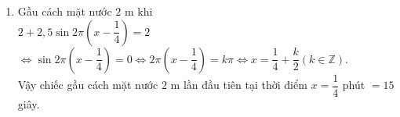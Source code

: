\begin{ex}
{\begin{enumerate}
			Tương tự, gầu  ở vị trí thấp $y=0{,}5$
			\begin{eqnarray*}
				& &\sin 2\pi \left( x-\dfrac{1}{4} \right) =-1\\ 
				& \Leftrightarrow& 2\pi  \left( x-\dfrac{1}{4} \right) =-\dfrac{\pi }{2}+k2\pi\\
				& \Leftrightarrow& x=k\ \left(  k\in \mathbb{Z} \right)\\
				& \Rightarrow & x\in \left\{0, 1,  2, 3, \ldots\right\}.
			\end{eqnarray*}
			Vậy gầu ở vị trí thấp nhất tại các thời điểm $0,1,2,3,\ldots  $ phút.
			\item Gầu cách mặt nước $2$ m khi\\ 
			$2+2{,}5\sin 2\pi \left( x-\dfrac{1}{4} \right)=2$ $\Leftrightarrow \sin 2\pi \left( x-\dfrac{1}{4} \right)=0 \Leftrightarrow 2\pi \left( x-\dfrac{1}{4}  \right) =k\pi \Leftrightarrow x=\dfrac{1}{4}+\dfrac{k}{2} \left( k\in \mathbb{Z} \right)$.\\
			Vậy chiếc gầu cách mặt nước $2$ m lần đầu tiên  tại thời điểm $x=\dfrac{1}{4}$ phút $=15$ giây.
		\end{enumerate}
	} 
\end{ex}

